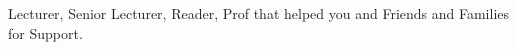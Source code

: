 \begin{acknowledgements}
Lecturer, Senior Lecturer, Reader, Prof that helped you
and Friends and Families for Support. 

\end{acknowledgements}
